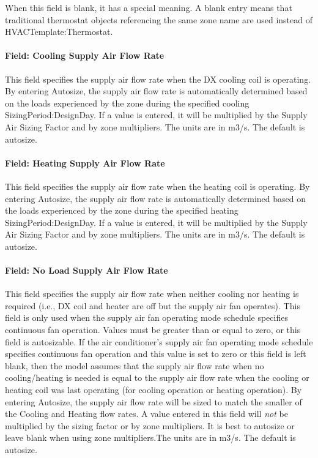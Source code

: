 When this field is blank, it has a special meaning. A blank entry means that traditional thermostat objects referencing the same zone name are used instead of HVACTemplate:Thermostat.

\paragraph{Field: Cooling Supply Air Flow Rate}\label{field-cooling-supply-air-flow-rate-000}

This field specifies the supply air flow rate when the DX cooling coil is operating. By entering Autosize, the supply air flow rate is automatically determined based on the loads experienced by the zone during the specified cooling SizingPeriod:DesignDay. If a value is entered, it will be multiplied by the Supply Air Sizing Factor and by zone multipliers. The units are in m3/s. The default is autosize.

\paragraph{Field: Heating Supply Air Flow Rate}\label{field-heating-supply-air-flow-rate-000}

This field specifies the supply air flow rate when the heating coil is operating. By entering Autosize, the supply air flow rate is automatically determined based on the loads experienced by the zone during the specified heating SizingPeriod:DesignDay. If a value is entered, it will be multiplied by the Supply Air Sizing Factor and by zone multipliers. The units are in m3/s. The default is autosize.

\paragraph{Field: No Load Supply Air Flow Rate}\label{field-no-load-supply-air-flow-rate}

This field specifies the supply air flow rate when neither cooling nor heating is required (i.e., DX coil and heater are off but the supply air fan operates). This field is only used when the supply air fan operating mode schedule specifies continuous fan operation. Values must be greater than or equal to zero, or this field is autosizable. If the air conditioner's supply air fan operating mode schedule specifies continuous fan operation and this value is set to zero or this field is left blank, then the model assumes that the supply air flow rate when no cooling/heating is needed is equal to the supply air flow rate when the cooling or heating coil was last operating (for cooling operation or heating operation). By entering Autosize, the supply air flow rate will be sized to match the smaller of the Cooling and Heating flow rates. A value entered in this field will \emph{not} be multiplied by the sizing factor or by zone multipliers. It is best to autosize or leave blank when using zone multipliers.The units are in m3/s. The default is autosize.

